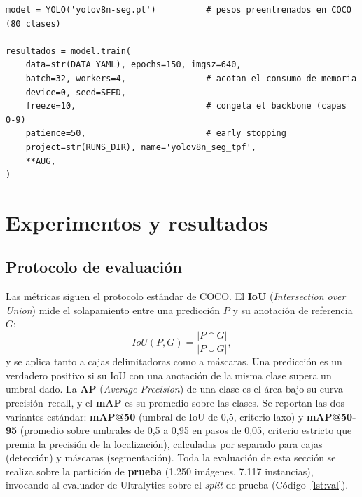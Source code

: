 \documentclass[11pt,a4paper]{article}
\begin{document}
\begin{lstlisting}[style=py,caption={Ajuste fino de YOLOv8n-seg desde los pesos
preentrenados en COCO, con el \emph{backbone} congelado y los hiperparámetros de
aumento del Código~\ref{lst:aug}.},label={lst:train}]
model = YOLO('yolov8n-seg.pt')          # pesos preentrenados en COCO (80 clases)

resultados = model.train(
    data=str(DATA_YAML), epochs=150, imgsz=640,
    batch=32, workers=4,                # acotan el consumo de memoria
    device=0, seed=SEED,
    freeze=10,                          # congela el backbone (capas 0-9)
    patience=50,                        # early stopping
    project=str(RUNS_DIR), name='yolov8n_seg_tpf',
    **AUG,
)
\end{lstlisting}

\section{Experimentos y resultados}
\label{sec:resultados}

\subsection{Protocolo de evaluación}

Las métricas siguen el protocolo estándar de COCO. El \textbf{IoU}
(\emph{Intersection over Union}) mide el solapamiento entre una predicción
$P$ y su anotación de referencia $G$:
\begin{equation}
  IoU(P, G) = \frac{|P \cap G|}{|P \cup G|},
\end{equation}
y se aplica tanto a cajas delimitadoras como a máscaras. Una predicción es un
verdadero positivo si su IoU con una anotación de la misma clase supera un
umbral dado. La \textbf{AP} (\emph{Average Precision}) de una clase es el
área bajo su curva precisión--recall, y el \textbf{mAP} es su promedio sobre
las clases. Se reportan las dos variantes estándar: \textbf{mAP@50} (umbral
de IoU de 0,5, criterio laxo) y \textbf{mAP@50-95} (promedio sobre umbrales
de 0,5 a 0,95 en pasos de 0,05, criterio estricto que premia la precisión de
la localización), calculadas por separado para cajas (detección) y máscaras
(segmentación). Toda la evaluación de esta sección se realiza sobre la
partición de \textbf{prueba} (1.250 imágenes, 7.117 instancias), invocando al
evaluador de Ultralytics sobre el \emph{split} de prueba (Código~\ref{lst:val}).
\end{document}
